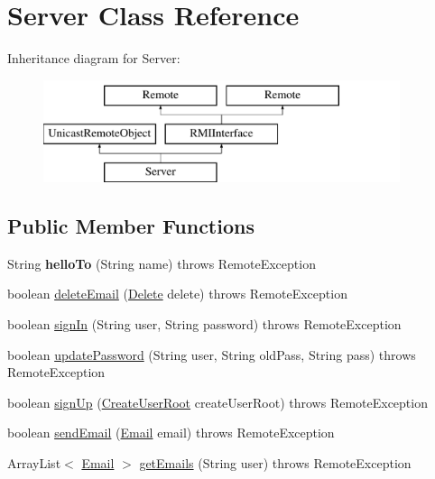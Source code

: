 \hypertarget{class_server}{}\section{Server Class Reference}
\label{class_server}
Inheritance diagram for Server\+:\begin{figure}[H]
\begin{center}
\leavevmode
\includegraphics[height=3.000000cm]{class_server}
\end{center}
\end{figure}
\subsection*{Public Member Functions}
\begin{DoxyCompactItemize}
\item 
\mbox{\label{class_server_a5bb8a4d74a82c7e2590de523648fa3ab}} 
String {\bfseries hello\+To} (String name)  throws Remote\+Exception 
\item 
boolean \hyperlink{class_server_ad679fc8c7704690482684e42cc15c740}{delete\+Email} (\hyperlink{class_delete}{Delete} delete)  throws Remote\+Exception
\item 
boolean \hyperlink{class_server_a817e1af39aeac07664ce011c44013e55}{sign\+In} (String user, String password)  throws Remote\+Exception 
\item 
boolean \hyperlink{class_server_a729c6728075152e3550160273869e992}{update\+Password} (String user, String old\+Pass, String pass)  throws Remote\+Exception 
\item 
boolean \hyperlink{class_server_a9e4fcd4cc8bfb0484735adfcf38be657}{sign\+Up} (\hyperlink{class_create_user_root}{Create\+User\+Root} create\+User\+Root)  throws Remote\+Exception 
\item 
boolean \hyperlink{class_server_a4c26769f2867086519a196bc92502af6}{send\+Email} (\hyperlink{class_email}{Email} email)  throws Remote\+Exception 
\item 
Array\+List$<$ \hyperlink{class_email}{Email} $>$ \hyperlink{class_server_a348f49650335ef5341a4d960d6adac2e}{get\+Emails} (String user)  throws Remote\+Exception 
\end{DoxyCompactItemize}
